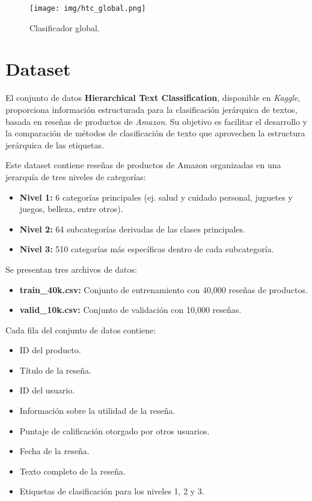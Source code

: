 \documentclass[12pt,letterpaper]{article}
\begin{document}
\begin{figure}[htp]
    \centering
    \texttt{[image: img/htc\_global.png]}
    \caption{Clasificador global.}
    \label{fig:htc_global}
\end{figure}

\section{Dataset}
El conjunto de datos \textbf{Hierarchical Text Classification}, disponible en \textit{Kaggle}, proporciona información estructurada para la clasificación jerárquica de textos, basada en reseñas de productos de \textit{Amazon}. Su objetivo es facilitar el desarrollo y la comparación de métodos de clasificación de texto que aprovechen la estructura jerárquica de las etiquetas.

Este dataset contiene reseñas de productos de Amazon organizadas en una jerarquía de tres niveles de categorías:

\begin{itemize}
    \item \textbf{Nivel 1:} 6 categorías principales (ej. salud y cuidado personal, juguetes y juegos, belleza, entre otros).
    \item \textbf{Nivel 2:} 64 subcategorías derivadas de las clases principales.
    \item \textbf{Nivel 3:} 510 categorías más específicas dentro de cada subcategoría.
\end{itemize}

Se presentan tres archivos de datos:

\begin{itemize}
    \item \textbf{train\_40k.csv:} Conjunto de entrenamiento con 40,000 reseñas de productos.
    \item \textbf{valid\_10k.csv:} Conjunto de validación con 10,000 reseñas.
\end{itemize}

Cada fila del conjunto de datos contiene:

\begin{itemize}
    \item ID del producto.
    \item Título de la reseña.
    \item ID del usuario.
    \item Información sobre la utilidad de la reseña.
    \item Puntaje de calificación otorgado por otros usuarios.
    \item Fecha de la reseña.
    \item Texto completo de la reseña.
    \item Etiquetas de clasificación para los niveles 1, 2 y 3.
\end{itemize}
\end{document}

